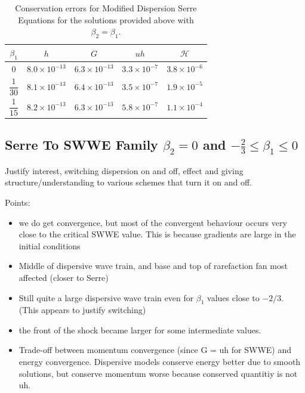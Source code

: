 \documentclass[10pt]{article}
\newcommand\T{\rule{0pt}{5ex }}       %
\begin{document}
\begin{table}
	\centering
	\begin{tabular}{ c | c | c | c | c }
		$\beta_1$ & $h$ & $G$ & $uh$ & $\mathcal{H}$  \\
		\hline
		\T $0$ &	$8.0 \times 10^{-13}$ & $6.3 \times 10^{-13}$  & $3.3 \times 10^{-7}$ &	 $3.8 \times 10^{-6}$ \\
		\T$\dfrac{1}{30}$ & $8.1 \times 10^{-13}$ &	$6.4 \times 10^{-13}$ & $3.5 \times 10^{-7}$	 &	$1.9 \times 10^{-5}$ \\
		\T$\dfrac{1}{15}$ & $8.2 \times 10^{-13}$ &	$6.3 \times 10^{-13}$ & $5.8 \times 10^{-7}$	 &	$1.1 \times 10^{-4}$ \\
		
	\end{tabular}
	\caption{Conservation errors for Modified Dispersion Serre Equations for the solutions provided above with $\beta_2 = \beta_1 $.}
\end{table}



\subsection{Serre To SWWE Family $\beta_2 = 0$ and $-\frac{2}{3} \le \beta_1 \le 0$}
Justify interest, switching dispersion on and off, effect and giving structure/understanding to various schemes that turn it on and off.

Points:
\begin{itemize}
	\item we do get convergence, but most of the convergent behaviour occurs very close to the critical SWWE value. This is because gradients are large in the initial conditions
	\item Middle of dispersive wave train, and base and top of rarefaction fan most affected (closer to Serre)
	\item Still quite a large dispersive wave train even for $\beta_1$ values close to $-2/3$. (This appears to justify switching)
	\item the front of the shock became larger for some intermediate values.
	\item Trade-off between momentum convergence (since G = uh for SWWE) and energy convergence. Dispersive models conserve energy better due to smooth solutions, but conserve momentum worse because conserved quantitiy is not uh. 
\end{itemize}
\end{document}
